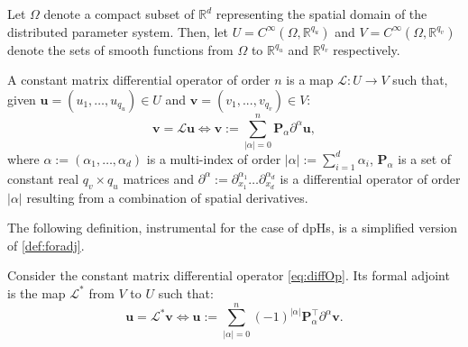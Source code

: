 Let $\Omega$ denote a compact subset of $\mathbb{R}^d$ representing the spatial domain of the distributed parameter system. Then, let ${U} = C^{\infty}(\Omega, \mathbb{R}^{q_u})$ and ${V}= C^{\infty}(\Omega, \mathbb{R}^{q_v})$ denote the sets of smooth functions from $\Omega$ to $\mathbb{R}^{q_u}$ and $\mathbb{R}^{q_v}$ respectively.
\begin{definition}
	A constant matrix differential operator of order $n$ is a map $\mathcal{L}:{U} \rightarrow {V}$ such that, given $\bm{u} = (u_1 , \dots , u_{q_u}) \in {U}$ and $\bm{v} = (v_1 , . . . , v_{q_v}) \in {V}$:
	\begin{equation}
	\label{eq:diffOp}
	\bm{v} = \mathcal{L} \bm{u} \iff \bm{v} := \sum_{|\alpha|=0}^n  \bm{P}_{\alpha} \partial^{\alpha} \bm{u},
	\end{equation}
	where $\alpha := (\alpha_1, \dots , \alpha_d)$ is a multi-index of order $|\alpha| := \sum_{i=1}^d \alpha_i$, $\bm{P}_\alpha$ is a set of constant real $q_v \times q_u$ matrices and $\partial^{\alpha} := \partial_{x_1}^{\alpha_1} \dots \partial_{x_d}^{\alpha_d}$ is a differential operator of order $|\alpha|$ resulting from a combination of spatial derivatives. 
\end{definition}
The following definition, instrumental for the case of dpHs, is a simplified version of \eqref{def:foradj}.
\begin{definition}
	Consider the constant matrix differential operator \eqref{eq:diffOp}. Its formal adjoint is the map $\mathcal{L}^*$ from ${V}$ to ${U}$ such that:
	\begin{equation}
	\bm{u} = \mathcal{L}^* \bm{v} \iff \bm{u} := \sum_{|\alpha|=0}^n  (-1)^{|\alpha|} \bm{P}_{\alpha}^\top \partial^{\alpha} \bm{v}.
	\end{equation}
\end{definition}

